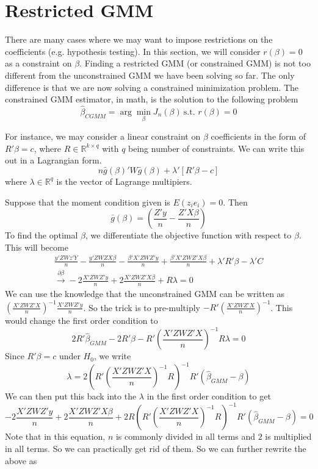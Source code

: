 \section{Restricted GMM}
There are many cases where we may want to impose restrictions on the coefficients (e.g. hypothesis testing). In this section, we will consider $r(\beta)=0$ as a constraint on $\beta$. Finding a restricted GMM (or constrained GMM) is not too different from the unconstrained GMM we have been solving so far. The only difference is that we are now solving a constrained minimization problem.  The constrained GMM estimator, in math, is the solution to the following problem
\[
\hat{\beta}_{CGMM}=\arg\min_\beta J_n(\beta) \ \text{s.t. } r(\beta)=0
\]
\par For instance, we may consider a linear constraint on $\beta$ coefficients in the form of $R'\beta=c$, where $R\in\mathbb{R}^{k\times q}$ with $q$ being number of constraints. We can write this out in a Lagrangian form.
\[
n\bar{g}(\beta)'W\bar{g}(\beta) + \lambda' [R'\beta-c]
\]
where $\lambda\in\mathbb{R}^q$ is the vector of Lagrange multipiers.\par
Suppose that the moment condition given is $E(z_ie_i)=0$. Then 
\[
\bar{g}(\beta)=\left(\frac{Z'y}{n}-\frac{Z'X\beta}{n}\right)
\] To find the optimal $\beta$, we differentiate the objective function with respect to $\beta$. This will become
\begin{gather*}
\frac{y'ZWz'Y}{n}-\frac{y'ZWZX\beta}{n}-\frac{\beta'X'ZWZ'y}{n}+\frac{\beta'X'ZWZ'X\beta}{n}+\lambda'R'\beta-\lambda'C\\
\xrightarrow{\partial\beta} -2\frac{X'ZWZ'y}{n}+2\frac{X'ZWZ'X\beta}{n}+R\lambda =0
\end{gather*}
We can use the knowledge that the unconstrained GMM can be written as \small{$\left(\frac{X'ZWZ'X}{n}\right)^{-1}\frac{X'ZWZ'y}{n}$}\normalsize. So the trick is to pre-multiply $-R'\left(\frac{X'ZWZ'X}{n}\right)^{-1}$. This would change the first order condition to
\[
2R'\hat{\beta}_{GMM}-2R'\beta-R'\left(\frac{X'ZWZ'X}{n}\right)^{-1}R\lambda =0
\]
Since $R'\beta=c$ under $H_0$, we write 
\[
\lambda = 2\left(R'\left(\frac{X'ZWZ'X}{n}\right)^{-1}R\right)^{-1}R'(\hat{\beta}_{GMM}-\beta)
\]
We can then put this back into the $\lambda$ in the first order condition to get
\[
-2\frac{X'ZWZ'y}{n}+2\frac{X'ZWZ'X\beta}{n}+2R\left(R'\left(\frac{X'ZWZ'X}{n}\right)^{-1}R\right)^{-1}R'(\hat{\beta}_{GMM}-\beta)=0
\]
Note that in this equation, $n$ is commonly divided in all terms and $2$ is multiplied in all terms. So we can practically get rid of them. So we can further rewrite the above as
